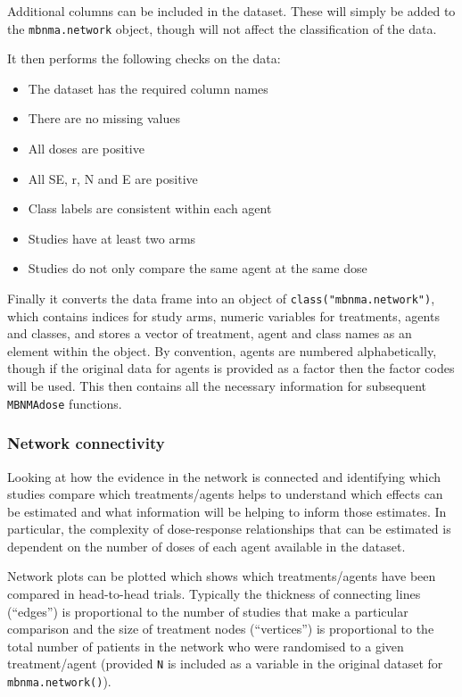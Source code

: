 \documentclass[]{article}
\providecommand{\tightlist}{%
  \setlength{\itemsep}{0pt}\setlength{\parskip}{0pt}}
\begin{document}
Additional columns can be included in the dataset. These will simply be
added to the \texttt{mbnma.network} object, though will not affect the
classification of the data.

It then performs the following checks on the data:

\begin{itemize}
\tightlist
\item
  The dataset has the required column names
\item
  There are no missing values
\item
  All doses are positive
\item
  All SE, r, N and E are positive
\item
  Class labels are consistent within each agent
\item
  Studies have at least two arms
\item
  Studies do not only compare the same agent at the same dose
\end{itemize}

Finally it converts the data frame into an object of
\texttt{class("mbnma.network")}, which contains indices for study arms,
numeric variables for treatments, agents and classes, and stores a
vector of treatment, agent and class names as an element within the
object. By convention, agents are numbered alphabetically, though if the
original data for agents is provided as a factor then the factor codes
will be used. This then contains all the necessary information for
subsequent \texttt{MBNMAdose} functions.

\hypertarget{network-connectivity}{%
\subsubsection{Network connectivity}\label{network-connectivity}}

Looking at how the evidence in the network is connected and identifying
which studies compare which treatments/agents helps to understand which
effects can be estimated and what information will be helping to inform
those estimates. In particular, the complexity of dose-response
relationships that can be estimated is dependent on the number of doses
of each agent available in the dataset.

Network plots can be plotted which shows which treatments/agents have
been compared in head-to-head trials. Typically the thickness of
connecting lines (``edges'') is proportional to the number of studies
that make a particular comparison and the size of treatment nodes
(``vertices'') is proportional to the total number of patients in the
network who were randomised to a given treatment/agent (provided
\texttt{N} is included as a variable in the original dataset for
\texttt{mbnma.network()}).
\end{document}
